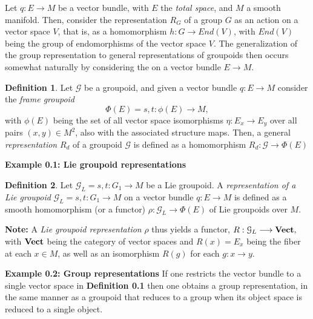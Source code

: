 \documentclass[12pt]{article}
\theoremstyle{plain}
\theoremstyle{definition}
\newtheorem{definition}{Definition}[section]
\numberwithin{equation}{section}
\newcommand{\grp}{\mathcal G}
\newcommand{\<}{{\langle}}
\begin{document}
Let  $q:E \longrightarrow  M$ be a vector bundle, with $E$ the \emph{total space}, and $M$ a smooth manifold. Then, consider the representation $R_G$ of a group $G$  as an action on a vector space $V$, that is, as a homomorphism $h: G \longrightarrow  End(V)$, with $End(V)$  being the group of endomorphisms of  the vector space $V$. The generalization of the group representation to general representations of groupoids then occurs somewhat naturally by considering the  on a vector bundle $E \longrightarrow M$.


\begin{definition}
Let $\grp$ be a groupoid, and given a vector bundle $q: E \longrightarrow  M$ consider the \emph{frame groupoid} 
$$\Phi(E)=s,t: \phi(E)\longrightarrow  M,$$  with $\phi(E)$ being the set of all vector space isomorphisms 
$\eta: E_x \longrightarrow  E_y$ over all pairs $(x,y) \in M^2$, also with the associated structure maps. Then, a general \emph{representation} $R_d$ of  a groupoid $\grp$ is defined as a homomorphism $R_d: \grp \longrightarrow  \Phi(E)$  
\end{definition}

{\bf Example 0.1: Lie groupoid representations}

\begin{definition}
Let $\grp_L = s, t : G_1 \longrightarrow M$ be a Lie groupoid.  A \emph{representation of a Lie groupoid} $\grp_L = s, t : G_1 \longrightarrow M$  on a vector bundle $q:E \longrightarrow  M$ is defined as a smooth homomorphism (or a functor) $\rho : \grp_L  \longrightarrow \Phi(E)$ of Lie groupoids over $M$.
\end{definition}

{\bf Note:}
A \emph{Lie groupoid representation} $\rho$ thus yields a functor, $R: \grp_L \longrightarrow {\bf Vect},$  with  ${\bf Vect}$ being the category of vector spaces and $R(x) = E_x$ being the fiber at each $x \in M$, as well as an isomorphism $R(g)$ for each $g: x \to y$.


{\bf Example 0.2: Group representations}
If one restricts the vector bundle to a single vector space in {\bf Definition 0.1} then one obtains a group representation, in the same manner as a groupoid that reduces to a group when its object space is reduced to a single object. 
\end{document}
